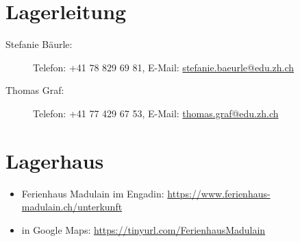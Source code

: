 \section*{Lagerleitung}
\begin{description}
  \item[Stefanie Bäurle:] Telefon: +41 78 829 69 81, E-Mail: \url{stefanie.baeurle@edu.zh.ch}
  \item[Thomas Graf:] Telefon: +41 77 429 67 53, E-Mail: \url{thomas.graf@edu.zh.ch}
\end{description}


\section*{Lagerhaus}
\begin{itemize}
  \item Ferienhaus Madulain im Engadin: \url{https://www.ferienhaus-madulain.ch/unterkunft}
  \item in Google Maps: \url{https://tinyurl.com/FerienhausMadulain}
\end{itemize}

